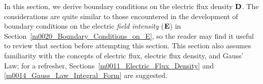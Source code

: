 

\label{m0021_Boundary_Conditions_on_D} %

In this section, we derive boundary conditions 
on the electric flux density ${\bf D}$.
The considerations are quite similar to those encountered in the development of boundary conditions on the electric \emph{field intensity} (${\bf E}$) in Section~\ref{m0020_Boundary_Conditions_on_E}, so the reader may find it useful to review that section before attempting this section.  
This section also assumes familiarity with the concepts of electric flux, electric flux density, and Gauss' Law; for a refresher, Sections~\ref{m0011_Electric_Flux_Density} and \ref{m0014_Gauss_Law_Integral_Form} are suggested. 

